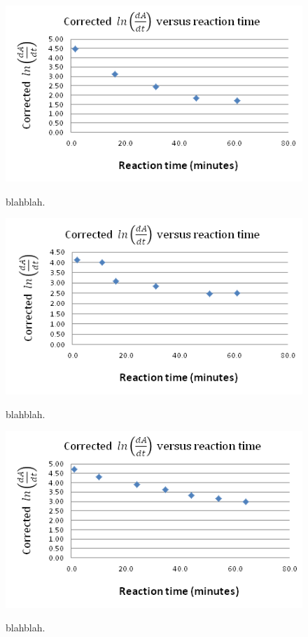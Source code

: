 \begin{figure}[h]
  \includegraphics[scale=0.5]{./Figures/05M_dipic_readings.png}\\
  \caption{blahblah.}\label{fig:0.05M_dipic_readings}
\end{figure}

\begin{figure}[h]
  \includegraphics[scale=0.5]{./Figures/032M_dipic_readings.png}\\
  \caption{blahblah.}\label{fig:0.032M_dipic_readings}
\end{figure}

\begin{figure}[h]
  \includegraphics[scale=0.5]{./Figures/016M_dipic_readings.png}\\
  \caption{blahblah.}\label{fig:0.016M_dipic_readings}
\end{figure}
